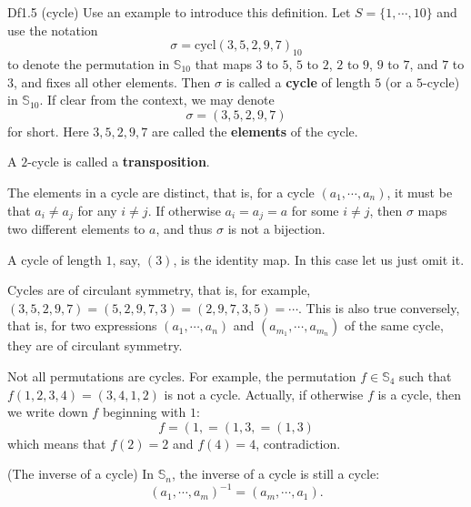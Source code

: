 \documentclass{article}
\newcommand{\cycl}{\text{cycl}}
\begin{document}
\begin{Df}{Df1.5 (cycle)}
    Use an example to introduce this definition. Let $S = \{1, \cdots, 10\}$ and use the notation
    $$ \sigma = \cycl (3, 5, 2, 9, 7)_{10} $$
    to denote the permutation in $\mathbb{S}_{10}$ that maps $3$ to $5$, $5$ to $2$, $2$ to $9$, $9$ to $7$, and $7$ to $3$, and fixes all other elements. Then $\sigma$ is called a \textbf{cycle} of length $5$ (or a $5$-cycle) in $\mathbb{S}_{10}$. If clear from the context, we may denote
    $$ \sigma = (3, 5, 2, 9, 7) $$
    for short. Here $3, 5, 2, 9, 7$ are called the \textbf{elements} of the cycle.
\end{Df}

\begin{Rmk}{}
    \begin{compactenum}
        \item \textcolor{Df}{A $2$-cycle is called a \textbf{transposition}.} 
        \item \textcolor{Th}{The elements in a cycle are distinct,} that is, for a cycle $(a_1, \cdots, a_n)$, it must be that $a_i\neq a_j$ for any $i\neq j$. If otherwise $a_i=a_j=a$ for some $i\neq j$, then $\sigma$ maps two different elements to $a$, and thus $\sigma$ is not a bijection.
        \item \textcolor{Th}{A cycle of length $1$, say, $(3)$, is the identity map.} \textcolor{Df}{In this case let us just omit it}.
        \item \textcolor{Th}{Cycles are of circulant symmetry, that is, for example, $(3, 5, 2, 9, 7) = (5, 2, 9, 7, 3) = (2, 9, 7, 3, 5) = \cdots$. This is also true conversely, that is, for two expressions $(a_1, \cdots, a_n)$ and $(a_{m_1}, \cdots, a_{m_n})$ of the same cycle, they are of circulant symmetry.}
        \item \textcolor{Th}{Not all permutations are cycles.} For example, the permutation $f\in\mathbb{S}_4$ such that $f(1,2,3,4) = (3,4,1,2)$ is not a cycle. Actually, if otherwise $f$ is a cycle, then we write down $f$ beginning with $1$:
        $$ f = \left(1, \right. = \left(1, 3, \right. = \left(1, 3\right) $$
        which means that $f(2) = 2$ and $f(4) = 4$, contradiction.
        \item \textcolor{Th}{(The inverse of a cycle) In $\mathbb{S}_n$, the inverse of a cycle is still a cycle:
        $$ (a_1, \cdots, a_m)^{-1} = (a_m, \cdots, a_1). $$}
    \end{compactenum}
\end{Rmk}
\end{document}
